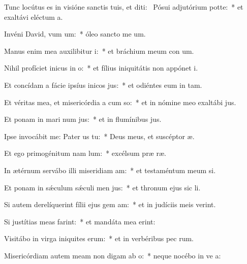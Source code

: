 \item Tunc locútus es in visióne sanctis tuis, et diti:~\pscross{} Pósui adjutórium  potte:~* et exaltávi eléctum   a.
\item Invéni David, vum um:~* óleo sancto me  um.
\item Manus enim mea auxilibitur i:~* et bráchium meum con um.
\item Nihil profíciet inicus in o:~* et fílius iniquitátis non appónet  i.
\item Et concídam a fácie ipsíus inicos jus:~* et odiéntes eum in  tam.
\item Et véritas mea, et misericórdia a cum so:~* et in nómine meo exaltábi  jus.
\item Et ponam in mari num jus:~* et in flumínibus  jus.
\item Ipse invocábit me: Pater us  tu:~* Deus meus, et suscéptor  æ.
\item Et ego primogénitum nam lum:~* excélsum præ  ræ.
\item In ætérnum servábo illi miseridiam am:~* et testaméntum meum  si.
\item Et ponam in sǽculum sǽculi men jus:~* et thronum ejus sic  li.
\item Si autem derelíquerint fílii ejus gem am:~* et in judíciis meis  verint.
\item Si justítias meas farint:~* et mandáta mea  erint:
\item Visitábo in virga iniquites erum:~* et in verbéribus pec rum.
\item Misericórdiam autem meam non digam ab o:~* neque nocébo in ve a:
